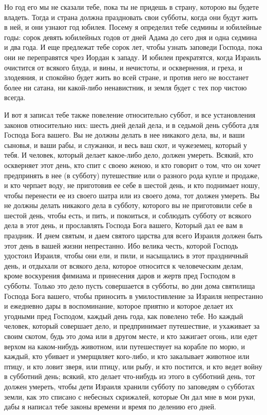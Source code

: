 Но год его мы не сказали тебе, пока ты не придешь
в страну, которою вы будете владеть. Тогда и
страна должна праздновать свои субботы, когда
они будут жить в ней, и они узнают год юбилея.
Посему я определил тебе седмины и юбилейные годы:
сорок девять юбилейных годов от дней Адама до
сего дня и одна седмина и два года. И еще
предлежат тебе сорок лет, чтобы узнать заповеди
Господа, пока они не переправятся чрез Иордан к
западу. И юбилеи прекратятся, когда Израиль
очистится от всякого блуда, и вины, и нечистоты, и
осквернения, и греха, и злодеяния, и спокойно
будет жить во всей стране, и против него не
восстанет более ни сатана, ни какой-либо
ненавистник, и земля будет с тех пор чистою
всегда.

И вот я записал тебе также повеление
относительно суббот, и все установления законов
относительно них: шесть дней делай дела, и в
седьмой день суббота для Господа Бога вашего. Вы
не должны делать в нее никакого дела, вы, и ваши
сыновья, и ваши рабы, и служанки, и весь ваш скот, и
чужеземец, который у тебя. И человек, который
делает какое-либо дело, должен умереть. Всякий,
кто оскверняет этот день, кто спит с своею женою,
и кто говорит о том, что он хочет предпринять в
нее (в субботу) путешествие или о разного рода
купле и продаже, и кто черпает воду, не приготовив
ее себе в шестой день, и кто поднимает ношу, чтобы
перенести ее из своего шатра или из своего дома,
тот должен умереть. Вы не должны делать никакого
дела в субботу, которого вы не приготовили себе в
шестой день, чтобы есть, и пить, и покоиться, и
соблюдать субботу от всякого дела в этот день, и
прославлять Господа Бога вашего, Который дал ее
вам в праздник. И днем святым, и даем святого
царства для всего Израиля должен быть этот день в
вашей жизни непрестанно. Ибо велика честь,
которой Господь удостоил Израиля, чтобы они ели,
и пили, и насыщались в этот праздничный день, и
отдыхали от всякого дела, которое относится к
человеческим делам, кроме воскурения фимиама и
принесения даров и жертв пред Господом в субботы.
Только это дело пусть совершается в субботы, во
дни дома святилища Господа Бога вашего, чтобы
приносить в умилостивление за Израиля
непрестанно и ежедневно дары в воспоминание,
которое приятно и которое делает их угодными
пред Господом, каждый день года, как повелено
тебе. Но каждый человек, который совершает дело, и
предпринимает путешествие, и ухаживает за своим
скотом, будь это дома или в другом месте, и кто
зажигает огонь, или едет верхом на каком-нибудь
животном, или путешествует на корабле по морю, и
каждый, кто убивает и умерщвляет кого-либо, и кто
закалывает животное или птицу, и кто ловит зверя,
или птицу, или рыбу, и кто постится, и кто ведет
войну в субботний день; всякий, кто делает
что-нибудь из этого в субботний день, тот должен
умереть, чтобы дети Израиля хранили субботу по
заповедям о субботах земли, как это списано с
небесных скрижалей, которые Он дал мне в мои руки,
дабы я написал тебе законы времени и время по
делению его дней.

